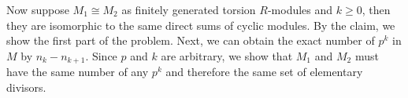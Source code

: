 \documentclass[12pt]{article}
\begin{document}
\begin{problem}[7]
\begin{enumerate}[label=(\alph*)]
Now suppose $ M_1 \cong M_2$ as finitely generated torsion $ R$-modules and $ k \geq 0$,  then they are isomorphic to the same direct sums of cyclic modules. By the claim, we show the first part of the problem. Next, we can obtain the exact number of $ p ^{k}$ in $ M$ by  $ n_k - n_{k+1}$. Since $ p$ and  $ k$ are arbitrary, we show that $ M_1$ and $ M_2$ must have the same number of any $ p ^{k}$ and therefore the same set of elementary divisors.


\end{enumerate}
\end{problem}
\end{document}

